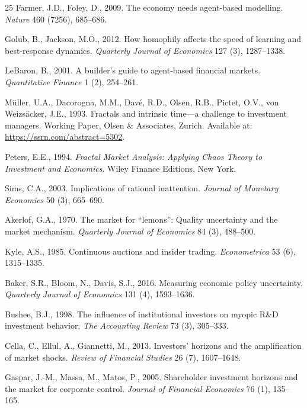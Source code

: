 \documentclass[preprint,12pt,authoryear]{elsarticle}
\begin{document}
\begin{thebibliography}{25}
Farmer, J.D., Foley, D., 2009.
The economy needs agent-based modelling.
\textit{Nature} 460 (7256), 685--686.

Golub, B., Jackson, M.O., 2012.
How homophily affects the speed of learning and best-response dynamics.
\textit{Quarterly Journal of Economics} 127 (3), 1287--1338.

LeBaron, B., 2001.
A builder's guide to agent-based financial markets.
\textit{Quantitative Finance} 1 (2), 254--261.

M{\"u}ller, U.A., Dacorogna, M.M., Dav{\'e}, R.D., Olsen, R.B.,
Pictet, O.V., von Weizs{\"a}cker, J.E., 1993.
Fractals and intrinsic time---a challenge to investment managers.
Working Paper, Olsen \& Associates, Zurich.
Available at: \url{https://ssrn.com/abstract=5302}.

Peters, E.E., 1994.
\textit{Fractal Market Analysis: Applying Chaos Theory to Investment and
Economics}.
Wiley Finance Editions, New York.

Sims, C.A., 2003.
Implications of rational inattention.
\textit{Journal of Monetary Economics} 50 (3), 665--690.

Akerlof, G.A., 1970.
The market for ``lemons'': Quality uncertainty and the market mechanism.
\textit{Quarterly Journal of Economics} 84 (3), 488--500.

Kyle, A.S., 1985.
Continuous auctions and insider trading.
\textit{Econometrica} 53 (6), 1315--1335.

Baker, S.R., Bloom, N., Davis, S.J., 2016.
Measuring economic policy uncertainty.
\textit{Quarterly Journal of Economics} 131 (4), 1593--1636.

Bushee, B.J., 1998.
The influence of institutional investors on myopic R\&D investment behavior.
\textit{The Accounting Review} 73 (3), 305--333.

Cella, C., Ellul, A., Giannetti, M., 2013.
Investors' horizons and the amplification of market shocks.
\textit{Review of Financial Studies} 26 (7), 1607--1648.

Gaspar, J.-M., Massa, M., Matos, P., 2005.
Shareholder investment horizons and the market for corporate control.
\textit{Journal of Financial Economics} 76 (1), 135--165.


\end{thebibliography}
\end{document}
